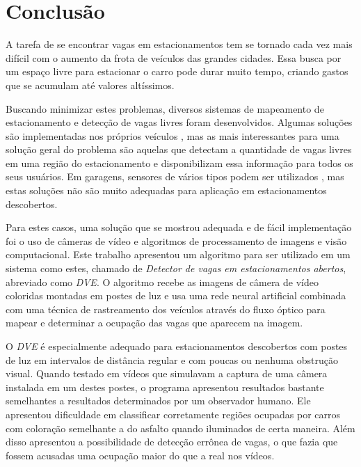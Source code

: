 \chapter{Conclusão}\label{cap:conclusao}

A tarefa de se encontrar vagas em estacionamentos tem se tornado cada vez mais difícil com o aumento da frota de veículos das grandes cidades. Essa busca por um espaço livre para estacionar o carro pode durar muito tempo, criando gastos que se acumulam até valores altíssimos.

Buscando minimizar estes problemas, diversos sistemas de mapeamento de estacionamento e detecção de vagas livres foram desenvolvidos. Algumas soluções são implementadas nos próprios veículos \cite{schmid2011parking}, mas as mais interessantes para uma solução geral do problema são aquelas que detectam a quantidade de vagas livres em uma região do estacionamento e disponibilizam essa informação para todos os seus usuários. Em garagens, sensores de vários tipos podem ser utilizados \cite{kianpisheh2012smart,lee2008intelligent,wolff2006parking}, mas estas soluções não são muito adequadas para aplicação em estacionamentos descobertos. 

Para estes casos, uma solução que se mostrou adequada e de fácil implementação foi o uso de câmeras de vídeo e algoritmos de processamento de imagens e visão computacional. Este trabalho apresentou um algoritmo para ser utilizado em um sistema como estes, chamado de \textit{Detector de vagas em estacionamentos abertos}, abreviado como \textit{DVE}. O algoritmo recebe as imagens de câmera de vídeo coloridas montadas em postes de luz e usa uma rede neural artificial combinada com uma técnica de rastreamento dos veículos através do fluxo óptico para mapear e determinar a ocupação das vagas que aparecem na imagem.

O \textit{DVE} é especialmente adequado para estacionamentos descobertos com postes de luz em intervalos de distância regular e com poucas ou nenhuma obstrução visual. Quando testado em vídeos que simulavam a captura de uma câmera instalada em um destes postes, o programa apresentou resultados bastante semelhantes a resultados determinados por um observador humano. Ele apresentou dificuldade em classificar corretamente regiões ocupadas por carros com coloração semelhante a do asfalto quando iluminados de certa maneira. Além disso apresentou a possibilidade de detecção errônea de vagas, o que fazia que fossem acusadas uma ocupação maior do que a real nos vídeos.


